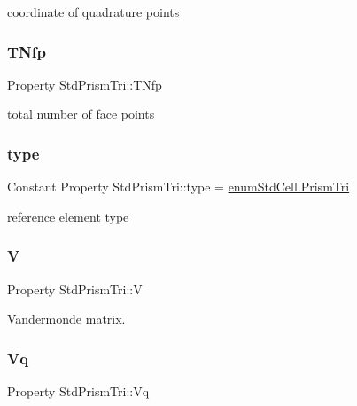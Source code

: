 coordinate of quadrature points 

\mbox{\label{class_std_prism_tri_abd9ddf06a9024c8894dd9f4fbbafc169}} 
\subsubsection{\texorpdfstring{T\+Nfp}{TNfp}}
{\footnotesize\ttfamily Property Std\+Prism\+Tri\+::\+T\+Nfp\hspace{0.3cm}{\ttfamily [protected]}}



total number of face points 

\mbox{\label{class_std_prism_tri_a51803876c1f6f01469a4b5820fac5553}} 
\subsubsection{\texorpdfstring{type}{type}}
{\footnotesize\ttfamily Constant Property Std\+Prism\+Tri\+::type = \hyperlink{classenum_std_cell_ac4c2fa4e189e76e103f3ff9b1d19b9e7a50e59d01719761402ae7fe95c54b1360}{enum\+Std\+Cell.\+Prism\+Tri}}



reference element type 

\mbox{\label{class_std_prism_tri_a2de460aab5349ff8fa131ce687f07f81}} 
\subsubsection{\texorpdfstring{V}{V}}
{\footnotesize\ttfamily Property Std\+Prism\+Tri\+::V\hspace{0.3cm}{\ttfamily [protected]}}



Vandermonde matrix. 

\mbox{\label{class_std_prism_tri_af8d7e4c3ab71b4ecec29dfc0d03801a3}} 
\subsubsection{\texorpdfstring{Vq}{Vq}}
{\footnotesize\ttfamily Property Std\+Prism\+Tri\+::\+Vq\hspace{0.3cm}{\ttfamily [protected]}}



